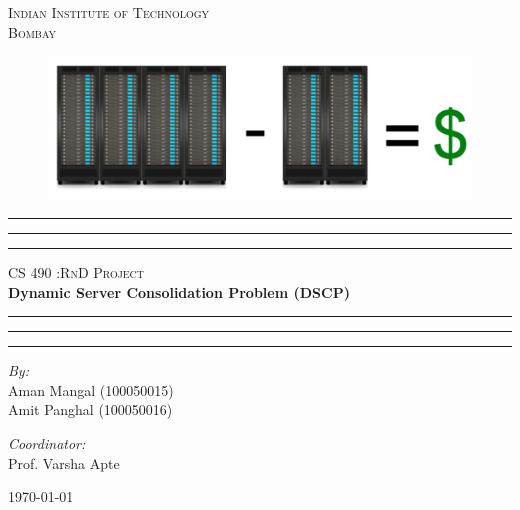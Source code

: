 \begin{titlepage}
\begin{center}
	\textsc{\LARGE Indian Institute of Technology
			\\Bombay} \\[2.5cm]
	\begin{figure}[ht!]
	\begin{center}
		\includegraphics[scale = 0.6]{images/1}
	\end{center}
	\end{figure}

    \vspace*{-0.6cm}
	\hrule \hrule \hrule
	\vspace{0.5cm}
	\textsc{\Large CS 490 :RnD Project}\\[0.5cm]
	{\huge \bfseries Dynamic Server Consolidation Problem (DSCP)} \\[0.5cm]
	\hrule \hrule \hrule
	\vspace{4cm}

	\begin{minipage}{0.5\textwidth}
	\begin{flushleft} \large
		\emph{By:} \\
		Aman Mangal (100050015) \\
		Amit Panghal (100050016)
	\end{flushleft}
	\end{minipage}
	\begin{minipage}{0.4\textwidth}
	\begin{flushright} \large
		\emph{Coordinator:} \\
		Prof. Varsha Apte
	\end{flushright}
	\end{minipage}
	\vspace{1cm}

	{\large \today}
\end{center}
\end{titlepage}